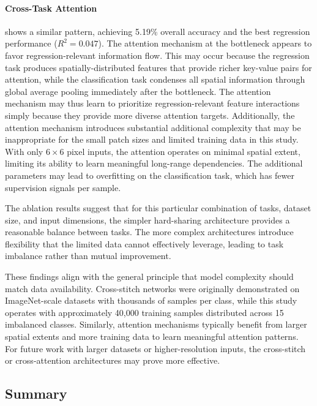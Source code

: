 \paragraph{Cross-Task Attention} shows a similar pattern, achieving 5.19\% overall accuracy and the best regression performance ($R^2 = 0.047$). The attention mechanism at the bottleneck appears to favor regression-relevant information flow. This may occur because the regression task produces spatially-distributed features that provide richer key-value pairs for attention, while the classification task condenses all spatial information through global average pooling immediately after the bottleneck. The attention mechanism may thus learn to prioritize regression-relevant feature interactions simply because they provide more diverse attention targets. Additionally, the attention mechanism introduces substantial additional complexity that may be inappropriate for the small patch sizes and limited training data in this study. With only $6\times 6$ pixel inputs, the attention operates on minimal spatial extent, limiting its ability to learn meaningful long-range dependencies. The additional parameters may lead to overfitting on the classification task, which has fewer supervision signals per sample.

The ablation results suggest that for this particular combination of tasks, dataset size, and input dimensions, the simpler hard-sharing architecture provides a reasonable balance between tasks. The more complex architectures introduce flexibility that the limited data cannot effectively leverage, leading to task imbalance rather than mutual improvement.

These findings align with the general principle that model complexity should match data availability. Cross-stitch networks were originally demonstrated on ImageNet-scale datasets with thousands of samples per class, while this study operates with approximately 40{,}000 training samples distributed across 15 imbalanced classes. Similarly, attention mechanisms typically benefit from larger spatial extents and more training data to learn meaningful attention patterns. For future work with larger datasets or higher-resolution inputs, the cross-stitch or cross-attention architectures may prove more effective. 

\subsection{Summary}
\label{subsec:treesat_summary}

